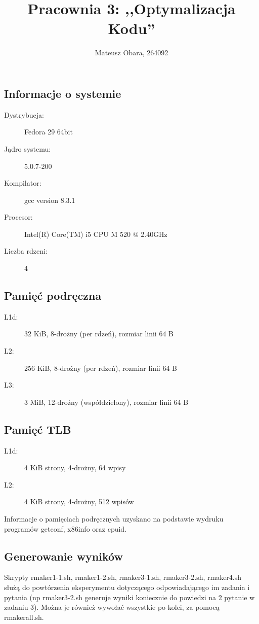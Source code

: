 \documentclass[a4paper,12pt]{mwart} %
\title{Pracownia 3: ,,Optymalizacja Kodu''}
\author{Mateusz Obara, 264092}
\begin{document}
\maketitle
\thispagestyle{empty}

\subsection*{Informacje o systemie}

\begin{description}
	\item[Dystrybucja:] Fedora 29 64bit
	\item[Jądro systemu:] 5.0.7-200
	\item[Kompilator:] gcc version 8.3.1
	\item[Procesor:] Intel(R) Core(TM) i5 CPU       M 520  @ 2.40GHz
	\item[Liczba rdzeni:] 4
\end{description}

\subsection*{Pamięć podręczna}

\begin{description}
	\item[L1d:] 32 KiB, 8-drożny (per rdzeń), rozmiar linii 64 B
	\item[L2:]  256 KiB, 8-drożny (per rdzeń), rozmiar linii 64 B
	\item[L3:] 3 MiB, 12-drożny (współdzielony), rozmiar linii 64 B
\end{description}

\subsection*{Pamięć TLB}

\begin{description}
	\item[L1d:] 4 KiB strony, 4-drożny, 64 wpisy
	\item[L2:] 4 KiB strony, 4-drożny, 512 wpisów
\end{description}

Informacje o pamięciach podręcznych uzyskano na podstawie wydruku programów getconf, x86info oraz cpuid.
\subsection*{Generowanie wyników}
Skrypty rmaker1-1.sh, rmaker1-2.sh, rmaker3-1.sh, rmaker3-2.sh, rmaker4.sh służą do powtórzenia eksperymentu dotyczącego odpowiadającego im zadania i pytania (np rmaker3-2.sh generuje wyniki koniecznie do powiedzi na 2 pytanie w zadaniu 3). Można je również wywołać wszystkie po kolei, za pomocą rmakerall.sh.
\end{document}
